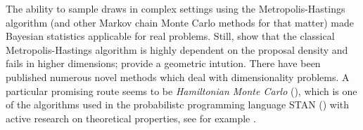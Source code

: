 The ability to sample draws in complex settings using the Metropolis-Hastings algorithm (and other Markov chain Monte Carlo methods for that matter) made Bayesian statistics applicable for real problems.
Still, \citet{Au2001EstimationOS} show that the classical Metropolis-Hastings algorithm is highly dependent on the proposal density and fails in higher dimensions; \citet{zuev08} provide a geometric intution.
There have been published numerous novel methods which deal with dimensionality problems.
A particular promising route seems to be \emph{Hamiltonian Monte Carlo} (\citet{duane87}), which is one of the algorithms used in the probabilistc programming language STAN (\citet{standev2018stancore}) with active research on theoretical properties, see for example \citet{betancourt2014geometric}.


%
